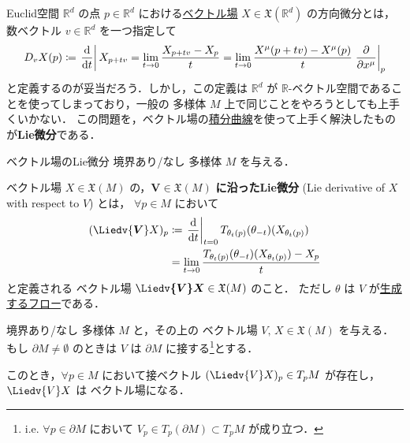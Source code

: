 \documentclass[geometry_main]{subfiles}
\begin{document}
Euclid空間 $\mathbb{R}^d$ の点 $p \in \mathbb{R}^d$ における\hyperref[def:vecf]{ベクトル場} $X \in \mathfrak{X}(\mathbb{R}^d)$ の方向微分とは，数ベクトル $v \in \mathbb{R}^d$ を一つ指定して
\begin{align}
    D_v X (p) \coloneqq \eval{\dv{}{t}} X_{p + tv} = \lim_{t \to 0} \frac{X_{p+tv} - X_p}{t} = \lim_{t\to 0} \frac{X^\mu (p+tv) - X^\mu (p)}{t} \eval{\pdv{}{x^\mu}}_p \label{eq:direction}
\end{align}
と定義するのが妥当だろう．しかし，この定義は $\mathbb{R}^d$ が $\mathbb{R}$-ベクトル空間であることを使ってしまっており，一般の \cinfty 多様体 $M$ 上で同じことをやろうとしても上手くいかない．
この問題を，ベクトル場の\hyperref[def:integral-curve]{積分曲線}を使って上手く解決したものが\textbf{Lie微分}である．

\begin{mydef}[label=def:Liedv]{ベクトル場のLie微分}
    境界あり/なし \cinfty 多様体 $M$ を与える．

    ベクトル場 $X \in \mathfrak{X}(M)$ の，$\bm{V} \in \mathfrak{X}(M)$ \textbf{に沿ったLie微分} (Lie derivative of $X$ with respect to $V$) とは，
    $\forall p \in M$ において
    \begin{align}
        (\Liedv{\bm{V}} X)_p &\coloneqq \eval{\dv{}{t}}_{t=0} T_{\theta_t (p)}(\theta_{-t})(X_{\theta_t(p)}) \\
        &= \lim_{t\to 0} \frac{T_{\theta_t(p)} (\theta_{-t}) (X_{\theta_t (p)}) - X_p}{t}
    \end{align}
    と定義される \cinfty ベクトル場 $\bm{\Liedv{V} X} \in \mathfrak{X}(M)$ のこと．
    ただし $\theta$ は $V$ が\hyperref[thm:fundamental-flow]{生成するフロー}である．
\end{mydef}

\begin{myprop}[label=prop:Liedv-smooth]{}
    境界あり/なし \cinfty 多様体 $M$ と，その上の \cinfty ベクトル場 $V,\, X \in \mathfrak{X}(M)$ を与える．
    もし $\partial M \neq \emptyset$ のときは $V$ は $\partial M$ に接する\footnote{i.e. $\forall p \in \partial M$ において $V_p \in T_p (\partial M) \subset T_p M$ が成り立つ．}とする．

    このとき，$\forall p \in M$ において接ベクトル $(\Liedv{V} X)_p \in T_p M$ が存在し，$\Liedv{V}X$ は \cinfty ベクトル場になる．
\end{myprop}
\end{document}
